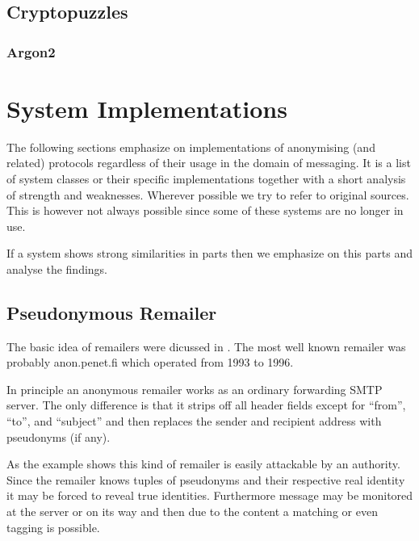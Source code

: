 
\subsection{Cryptopuzzles}

\subsubsection{Argon2}

\section{System Implementations\label{sec:sysImpl}}
The following sections emphasize on implementations of anonymising (and related) protocols regardless of their usage in the domain of messaging. It is a list of system classes or their specific implementations together with a short analysis of strength and weaknesses. Wherever possible we try to refer to original sources. This is however not always possible since some of these systems are no longer in use.

If a system shows strong similarities in parts then we emphasize on this parts and analyse the findings.

\subsection{Pseudonymous Remailer\label{sec:remPseudo}}
The basic idea of remailers were dicussed in \cite{CHAUM1}. The most well known remailer was probably anon.penet.fi which operated from 1993 to 1996. 

In principle an anonymous remailer works as an ordinary forwarding SMTP server. The only difference is that it strips off all header fields except for ``from'', ``to'', and ``subject'' and then replaces the sender and recipient address with pseudonyms (if any). 

As the example shows this kind of remailer is easily attackable by an authority. Since the remailer knows tuples of pseudonyms and their respective real identity it may be forced to reveal true identities. Furthermore message may be monitored at the server or on its way and then due to the content a matching or even tagging is possible.

